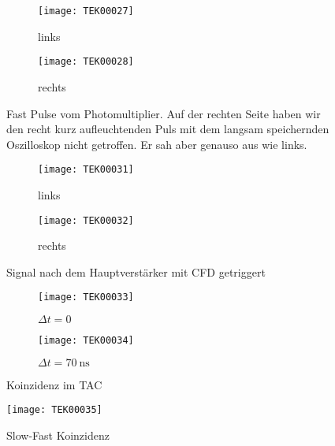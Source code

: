 \documentclass[11pt, ngerman, fleqn, DIV=15, headinclude, BCOR=2cm]{scrreprt}
\begin{document}
\begin{figure}
	\centering
	\begin{subfigure}{0.49 \textwidth}
		\texttt{[image: TEK00027]}
		\caption{%
			links
		}
		\label{fig:fast_signal-li}
	\end{subfigure}
	\begin{subfigure}{0.49 \textwidth}
		\texttt{[image: TEK00028]}
		\caption{%
			rechts
		}
		\label{fig:fast_signal-re}
	\end{subfigure}
	\caption{%
		Fast Pulse vom Photomultiplier. Auf der rechten Seite haben wir
		den recht kurz aufleuchtenden Puls mit dem langsam speichernden
		Oszilloskop nicht getroffen. Er sah aber genauso aus wie links.
	}
	\label{fig:fast_signal}
\end{figure}

\begin{figure}
	\centering
	\begin{subfigure}{0.49 \textwidth}
		\texttt{[image: TEK00031]}
		\caption{%
			links
		}
		\label{fig:fast_signal_cfd_trig-li}
	\end{subfigure}
	\begin{subfigure}{0.49 \textwidth}
		\texttt{[image: TEK00032]}
		\caption{%
			rechts
		}
		\label{fig:fast_signal_cfd_trig-re}
	\end{subfigure}
	\caption{%
		Signal nach dem Hauptverstärker mit CFD getriggert
	}
	\label{fig:fast_signal_cfd_trig}
\end{figure}

\fehlt%

\begin{figure}
	\centering
	\begin{subfigure}{0.49 \textwidth}
		\texttt{[image: TEK00033]}
		\caption{%
			$\Delta t = 0$
		}
		\label{fig:fast_signal_tac_koinzidenz-t0}
	\end{subfigure}
	\begin{subfigure}{0.49 \textwidth}
		\texttt{[image: TEK00034]}
		\caption{%
			$\Delta t = \SI{70}{\nano\second}$
		}
		\label{fig:fast_signal_tac_koinzidenz-t5-16}
	\end{subfigure}
	\caption{%
		Koinzidenz im TAC
	}
	\label{fig:fast_signal_tac_koinzidenz}
\end{figure}

\begin{figure}
	\centering
	\texttt{[image: TEK00035]}
	\caption{%
		Slow-Fast Koinzidenz
	}
	\label{fig:slow_fast_koinzidenz}
\end{figure}
\end{document}
